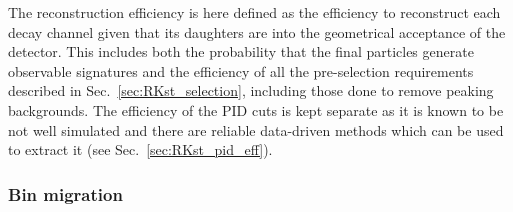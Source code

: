 The reconstruction efficiency is here defined as the efficiency to reconstruct
each decay channel given that its daughters are into the geometrical acceptance
of the detector. This includes both the probability that the final particles generate
observable signatures and the efficiency of all the pre-selection requirements described
in Sec.~\ref{sec:RKst_selection}, including those done to remove peaking backgrounds. 
The efficiency of the PID cuts is kept separate as it is known to be not well simulated
and there are reliable data-driven methods which can be used to extract it (see Sec.~\ref{sec:RKst_pid_eff}).

\subsubsection{Bin migration}

